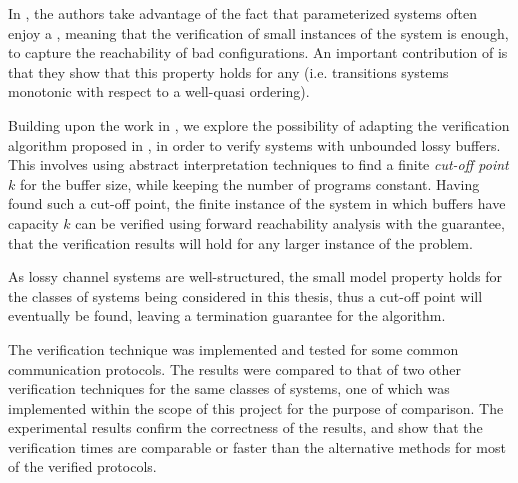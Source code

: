 In \cite{parosh}, the authors take advantage of the fact that parameterized systems often enjoy a , meaning that the verification of small instances of the system is enough, to capture the reachability of bad configurations. An important contribution of \cite{parosh} is that they show that this property holds for any \cite{abdulla2010} (i.e. transitions systems monotonic with respect to a well-quasi ordering).


Building upon the work in \cite{parosh}, we explore the possibility of adapting the verification algorithm proposed in \cite{parosh}, in order to verify systems with unbounded lossy buffers. This involves using abstract interpretation techniques to find a finite \emph{cut-off point} $k$ for the buffer size, while keeping the number of programs constant. Having found such a cut-off point, the finite instance of the system in which buffers have capacity $k$ can be verified using forward reachability analysis with the guarantee, that the verification results will hold for any larger instance of the problem.

As lossy channel systems are well-structured, the small model property holds for the classes of systems being considered in this thesis, thus a cut-off point will eventually be found, leaving a termination guarantee for the algorithm.

The verification technique was implemented and tested for some common communication protocols. The results were compared to that of two other verification techniques for the same classes of systems, one of which was implemented within the scope of this project for the purpose of comparison. The experimental results confirm the correctness of the results, and show that the verification times are comparable or faster than the alternative methods for most of the verified protocols.

